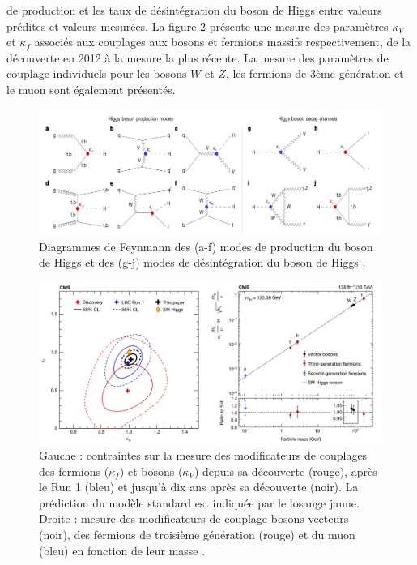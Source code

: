 de production et les taux de désintégration du boson de Higgs entre valeurs prédites et valeurs mesurées. La figure \ref{Cmodifiers} présente une mesure des paramètres $\kappa_{V}$ et $\kappa_f$ associés aux couplages aux bosons et fermions massifs respectivement, de la découverte en 2012 à la mesure la plus récente. La mesure des paramètres de couplage individuels pour les bosons $W$ et $Z$, les fermions de 3ème génération et le muon sont également présentés.

\begin{figure}
\centering
    \includegraphics[scale=0.4]{Chapitre5/Images/Hdecays.png} 
    \caption{Diagrammes de Feynmann des (a-f) modes de production du boson de Higgs et des (g-j) modes de désintégration du boson de Higgs \cite{higgs10years}.}
    \label{Hdecays}
\end{figure}

\begin{figure}
\centering
    \includegraphics[scale=0.25]{Chapitre5/Images/Cmodifiers.png} 
    \caption{Gauche : contraintes sur la mesure des modificateurs de couplages des fermions ($\kappa_f$) et bosons ($\kappa_V$) depuis sa découverte (rouge), après le Run 1 (bleu) et jusqu'à dix ans après sa découverte (noir). La prédiction du modèle standard est indiquée par le losange jaune. Droite : mesure des modificateurs de couplage bosons vecteurs (noir), des fermions de troisième génération (rouge) et du muon (bleu) en fonction de leur masse \cite{higgs10years}.}
    \label{Cmodifiers}
\end{figure}


